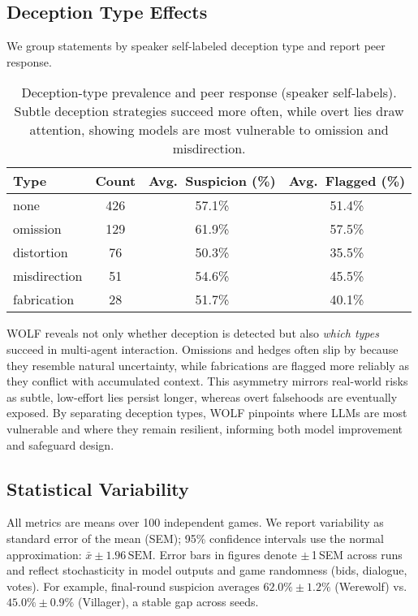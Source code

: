 \documentclass{article}
\begin{document}
\subsection{Deception Type Effects}
We group statements by speaker self-labeled deception type and report peer response.

\begin{table}[h]
\centering
\caption{Deception-type prevalence and peer response (speaker self-labels). Subtle deception strategies succeed more often, while overt lies draw attention, showing models are most vulnerable to omission and misdirection.}
\label{tab:types}
\begin{tabular}{lccc}
\toprule
\textbf{Type} & \textbf{Count} & \textbf{Avg.\ Suspicion (\%)} & \textbf{Avg.\ Flagged (\%)} \\
\midrule
none         & 426 & 57.1\% & 51.4\% \\
omission     & 129 & 61.9\% & 57.5\% \\
distortion   &  76 & 50.3\% & 35.5\% \\
misdirection &  51 & 54.6\% & 45.5\% \\
fabrication  &  28 & 51.7\% & 40.1\% \\
\bottomrule
\end{tabular}
\end{table}

WOLF reveals not only whether deception is detected but also \emph{which types} succeed in multi-agent interaction. Omissions and hedges often slip by because they resemble natural uncertainty, while fabrications are flagged more reliably as they conflict with accumulated context. This asymmetry mirrors real-world risks as subtle, low-effort lies persist longer, whereas overt falsehoods are eventually exposed. By separating deception types, WOLF pinpoints where LLMs are most vulnerable and where they remain resilient, informing both model improvement and safeguard design.

\subsection{Statistical Variability}
All metrics are means over 100 independent games. We report variability as standard error of the mean (SEM); 95\% confidence intervals use the normal approximation: $\bar{x} \pm 1.96\,\mathrm{SEM}$. Error bars in figures denote $\pm$\,1\,SEM across runs and reflect stochasticity in model outputs and game randomness (bids, dialogue, votes). For example, final-round suspicion averages $62.0\% \pm 1.2\%$ (Werewolf) vs.\ $45.0\% \pm 0.9\%$ (Villager), a stable gap across seeds.
\end{document}
